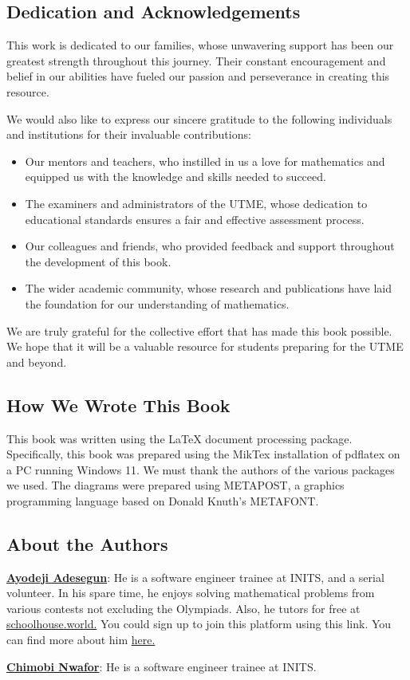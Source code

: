 \documentclass[a4paper]{book}
\begin{document}
\begin{frontmatter}
\chapter*{Dedication and Acknowledgements}

This work is dedicated to our families, whose unwavering support has been our greatest strength throughout this journey. Their constant encouragement and belief in our abilities have fueled our passion and perseverance in creating this resource.

We would also like to express our sincere gratitude to the following individuals and institutions for their invaluable contributions:
\begin{itemize}
\item Our mentors and teachers, who instilled in us a love for mathematics and equipped us with the knowledge and skills needed to succeed.
\item The examiners and administrators of the UTME, whose dedication to educational standards ensures a fair and effective assessment process.
\item  Our colleagues and friends, who provided feedback and support throughout the development of this book.
\item The wider academic community, whose research and publications have laid the foundation for our understanding of mathematics.
\end{itemize}

We are truly grateful for the collective effort that has made this book possible. We hope that it will be a valuable resource for students preparing for the UTME and beyond.

\section*{How We Wrote This Book}
This book was written using the LaTeX document processing package. Specifically, this book was prepared using the MikTex installation of pdflatex on a PC running Windows 11. We must thank the authors of the various packages we used. The diagrams were prepared using METAPOST, a graphics programming language based on Donald Knuth's METAFONT.

\section*{About the Authors}
\begin{description}
\item \href{https://linkedin.com/in/ayodejiades}{\textbf{Ayodeji Adesegun}}: He is a software engineer trainee at INITS, and  a serial volunteer. In his spare time, he enjoys solving mathematical problems from various contests not excluding the Olympiads. Also, he tutors for free at \href{https://schoolhouse.world}{schoolhouse.world.} You could sign up to join this platform using this link. You can find more about him \href{https://ayodejiades.vercel.app}{here.}
\item \href{https://linkedin.com/in/jeremaih-nwafor}{\textbf{Chimobi Nwafor}}: He is a software engineer trainee at INITS. 
\end{description}


\end{frontmatter}
\end{document}
